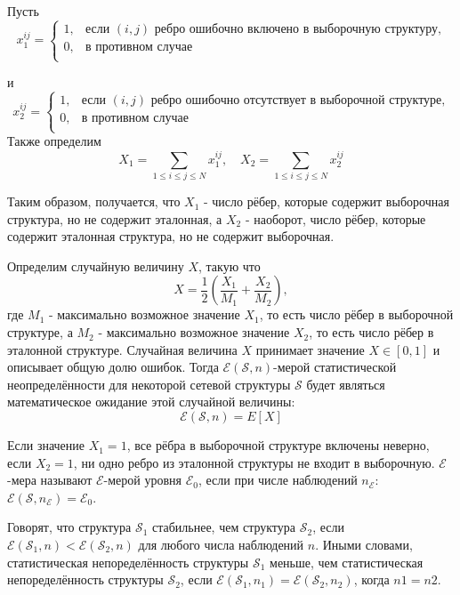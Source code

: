 Пусть 
\begin{equation*}
  x_{1}^{i j} =
    \begin{cases}
      1, & \text{если $(i,j)$ ребро ошибочно включено в выборочную структуру,}\\
      0, & \text{в противном случае}\\
    \end{cases}       
\end{equation*}

и
\begin{equation*}
  x_{2}^{i j} =
    \begin{cases}
      1, & \text{если $(i,j)$ ребро ошибочно отсутствует в выборочной структуре,}\\
      0, & \text{в противном случае}\\
    \end{cases}       
\end{equation*}
Также определим
\[
X_1=\sum_{1\leq i \leq j \leq N}{x_{1}^{i j}}, \quad  X_2=\sum_{1\leq i \leq j \leq N}{x_{2}^{i j}}
\]

Таким образом, получается, что $X_1$ - число рёбер, которые содержит выборочная структура, но не содержит эталонная, а $X_2$ - наоборот, число рёбер, которые содержит эталонная структура, но не содержит выборочная.

Определим случайную величину $X$, такую что
\begin{equation}
X = \frac{1}{2}\left( \frac{X_1}{M_1}+\frac{X_2}{M_2} \right),
\end{equation}
где $M_1$ - максимально возможное значение $X_1$, то есть число рёбер в выборочной структуре, а $M_2$ - максимально возможное значение $X_2$, то есть число рёбер в эталонной структуре. Случайная величина $X$ принимает значение $X \in [0,1]$ и описывает общую долю ошибок. 
Тогда $\mathcal{E}(\mathcal{S}, n)$-мерой статистической неопределённости для некоторой сетевой структуры $\mathcal{S}$ будет являться математическое ожидание этой случайной величины: 
\begin{equation}
\mathcal{E}(\mathcal{S},n) = E[X]
\end{equation}

Если значение $X_1=1$, все рёбра в выборочной структуре включены неверно, если $X_2=1$, ни одно ребро из эталонной структуры не входит в выборочную. $\mathcal{E}$-мера называют $\mathcal{E}$-мерой уровня $\mathcal{E}_0$, если при числе наблюдений $n_\mathcal{E}$: $\mathcal{E}(\mathcal{S},n_\mathcal{E}) = \mathcal{E}_0$.

Говорят, что структура $\mathcal{S}_1$ стабильнее, чем структура $\mathcal{S}_2$, если $\mathcal{E}( \mathcal{S}_1, n) < \mathcal{E}(\mathcal{S}_2,n) $ для любого числа наблюдений $n$. Иными словами, статистическая непоределённость структуры $\mathcal{S}_1$  меньше, чем статистическая непоределённость структуры $\mathcal{S}_2$, если $\mathcal{E}(\mathcal{S}_1,n_1) = \mathcal{E}(\mathcal{S}_2,n_2) $, когда $n1=n2$.


